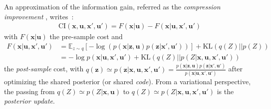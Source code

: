 \documentclass{article}
\begin{document}

An approximation of the information gain, referred as the \emph{compression improvement} \cite{schmidhuber2007simple,houthooft2016vime},
writes~:
\begin{align}
\text{CI}(\boldsymbol{x},\boldsymbol{u}, \boldsymbol{x}', \boldsymbol{u}') = F(\boldsymbol{x}|\boldsymbol{u}) - F(\boldsymbol{x}|\boldsymbol{u}, \boldsymbol{x}', \boldsymbol{u}') 
\end{align}	
with $F(\boldsymbol{x}|\boldsymbol{u})$ the pre-sample cost and  
\begin{align}
F(\boldsymbol{x}|\boldsymbol{u}, \boldsymbol{x}', \boldsymbol{u}') &= 
\mathbb{E}_{z\sim q} \left[-\log (p(\boldsymbol{x}|\boldsymbol{z}, \boldsymbol{u}) p(\boldsymbol{z}|\boldsymbol{x}', \boldsymbol{u}'))\right] +\text{KL}(q(Z)||p(Z))\label{eq:CI-prior}\\
&= -\log p(\boldsymbol{x}| \boldsymbol{u}, \boldsymbol{x}', \boldsymbol{u}') + \text{KL}(q(Z)||p(Z|\boldsymbol{x}, \boldsymbol{u}, \boldsymbol{x}', \boldsymbol{u}'))\label{eq:CI-post}
\end{align}
the \emph{post-sample} cost, with $q(\boldsymbol{z}) \simeq p(\boldsymbol{z}|\boldsymbol{x}, \boldsymbol{u}, \boldsymbol{x}', \boldsymbol{u}') = \frac{p(\boldsymbol{x}|\boldsymbol{z}, \boldsymbol{u})p(\boldsymbol{z}|\boldsymbol{x}', \boldsymbol{u}')}{p(\boldsymbol{x}|\boldsymbol{u},\boldsymbol{x}',\boldsymbol{u}')}$ after optimizing the shared posterior (or shared \emph{code}). From a variational perspective, the passing from $q(Z) \simeq p(Z|\boldsymbol{x}, \boldsymbol{u})$ to $q(Z) \simeq p(Z|\boldsymbol{x}, \boldsymbol{u}, \boldsymbol{x}', \boldsymbol{u}')$ is the \emph{posterior update}.
\end{document}
